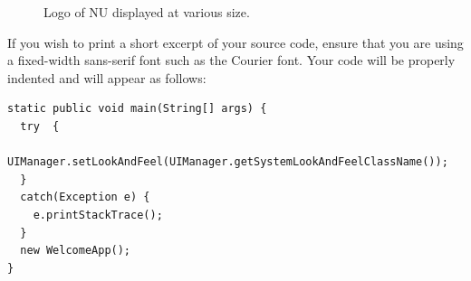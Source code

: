 \documentclass[]{final_report}
\begin{document}
\begin{figure}[ht]
\centering
\fboxsep 2mm
\caption{\label{fig:logo} Logo of NU displayed at various size.}
\end{figure} 

If you wish to print a short excerpt of your source code,  ensure that you are using a fixed-width sans-serif font such as the Courier font. Your code will be properly indented and will appear as follows:

\begin{verbatim}
static public void main(String[] args) {
  try  {
    UIManager.setLookAndFeel(UIManager.getSystemLookAndFeelClassName());
  }
  catch(Exception e) {
    e.printStackTrace();
  }
  new WelcomeApp();
} 
\end{verbatim}


\newpage

 

\label{endpage}
\end{document}
